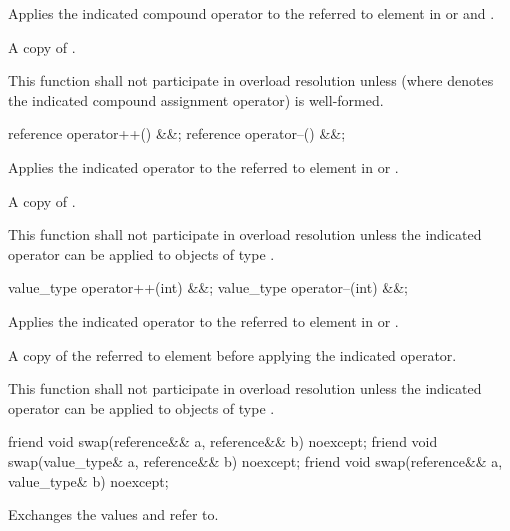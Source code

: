\begin{itemdescr}
  \pnum\effects
  Applies the indicated compound operator to the referred to element in  or  and .

  \pnum\returns
  A copy of .

  \pnum\remarks
  This function shall not participate in overload resolution unless  (where  denotes the indicated compound assignment operator) is well-formed.
\end{itemdescr}

\begin{itemdecl}
reference operator++() &&;
reference operator--() &&;
\end{itemdecl}

\begin{itemdescr}
  \pnum\effects
  Applies the indicated operator to the referred to element in  or .

  \pnum\returns
  A copy of .

  \pnum\remarks
  This function shall not participate in overload resolution unless the indicated operator can be applied to objects of type .
\end{itemdescr}

\begin{itemdecl}
value_type operator++(int) &&;
value_type operator--(int) &&;
\end{itemdecl}

\begin{itemdescr}
  \pnum\effects
  Applies the indicated operator to the referred to element in  or .

  \pnum\returns
  A copy of the referred to element before applying the indicated operator.

  \pnum\remarks
  This function shall not participate in overload resolution unless the indicated operator can be applied to objects of type .
\end{itemdescr}

\begin{itemdecl}
friend void swap(reference&& a, reference&& b) noexcept;
friend void swap(value_type& a, reference&& b) noexcept;
friend void swap(reference&& a, value_type& b) noexcept;
\end{itemdecl}

\begin{itemdescr}
  \pnum\effects
  Exchanges the values  and  refer to.
\end{itemdescr}

